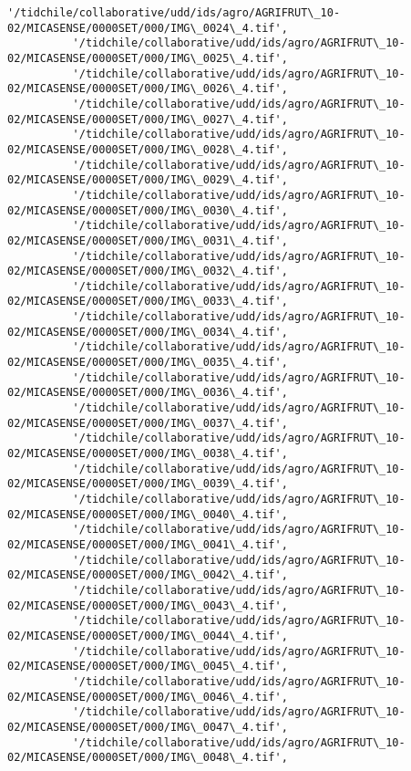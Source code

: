\documentclass[11pt]{article}
\begin{document}
\begin{Verbatim}[commandchars=\\\{\}]
          '/tidchile/collaborative/udd/ids/agro/AGRIFRUT\_10-02/MICASENSE/0000SET/000/IMG\_0024\_4.tif',
          '/tidchile/collaborative/udd/ids/agro/AGRIFRUT\_10-02/MICASENSE/0000SET/000/IMG\_0025\_4.tif',
          '/tidchile/collaborative/udd/ids/agro/AGRIFRUT\_10-02/MICASENSE/0000SET/000/IMG\_0026\_4.tif',
          '/tidchile/collaborative/udd/ids/agro/AGRIFRUT\_10-02/MICASENSE/0000SET/000/IMG\_0027\_4.tif',
          '/tidchile/collaborative/udd/ids/agro/AGRIFRUT\_10-02/MICASENSE/0000SET/000/IMG\_0028\_4.tif',
          '/tidchile/collaborative/udd/ids/agro/AGRIFRUT\_10-02/MICASENSE/0000SET/000/IMG\_0029\_4.tif',
          '/tidchile/collaborative/udd/ids/agro/AGRIFRUT\_10-02/MICASENSE/0000SET/000/IMG\_0030\_4.tif',
          '/tidchile/collaborative/udd/ids/agro/AGRIFRUT\_10-02/MICASENSE/0000SET/000/IMG\_0031\_4.tif',
          '/tidchile/collaborative/udd/ids/agro/AGRIFRUT\_10-02/MICASENSE/0000SET/000/IMG\_0032\_4.tif',
          '/tidchile/collaborative/udd/ids/agro/AGRIFRUT\_10-02/MICASENSE/0000SET/000/IMG\_0033\_4.tif',
          '/tidchile/collaborative/udd/ids/agro/AGRIFRUT\_10-02/MICASENSE/0000SET/000/IMG\_0034\_4.tif',
          '/tidchile/collaborative/udd/ids/agro/AGRIFRUT\_10-02/MICASENSE/0000SET/000/IMG\_0035\_4.tif',
          '/tidchile/collaborative/udd/ids/agro/AGRIFRUT\_10-02/MICASENSE/0000SET/000/IMG\_0036\_4.tif',
          '/tidchile/collaborative/udd/ids/agro/AGRIFRUT\_10-02/MICASENSE/0000SET/000/IMG\_0037\_4.tif',
          '/tidchile/collaborative/udd/ids/agro/AGRIFRUT\_10-02/MICASENSE/0000SET/000/IMG\_0038\_4.tif',
          '/tidchile/collaborative/udd/ids/agro/AGRIFRUT\_10-02/MICASENSE/0000SET/000/IMG\_0039\_4.tif',
          '/tidchile/collaborative/udd/ids/agro/AGRIFRUT\_10-02/MICASENSE/0000SET/000/IMG\_0040\_4.tif',
          '/tidchile/collaborative/udd/ids/agro/AGRIFRUT\_10-02/MICASENSE/0000SET/000/IMG\_0041\_4.tif',
          '/tidchile/collaborative/udd/ids/agro/AGRIFRUT\_10-02/MICASENSE/0000SET/000/IMG\_0042\_4.tif',
          '/tidchile/collaborative/udd/ids/agro/AGRIFRUT\_10-02/MICASENSE/0000SET/000/IMG\_0043\_4.tif',
          '/tidchile/collaborative/udd/ids/agro/AGRIFRUT\_10-02/MICASENSE/0000SET/000/IMG\_0044\_4.tif',
          '/tidchile/collaborative/udd/ids/agro/AGRIFRUT\_10-02/MICASENSE/0000SET/000/IMG\_0045\_4.tif',
          '/tidchile/collaborative/udd/ids/agro/AGRIFRUT\_10-02/MICASENSE/0000SET/000/IMG\_0046\_4.tif',
          '/tidchile/collaborative/udd/ids/agro/AGRIFRUT\_10-02/MICASENSE/0000SET/000/IMG\_0047\_4.tif',
          '/tidchile/collaborative/udd/ids/agro/AGRIFRUT\_10-02/MICASENSE/0000SET/000/IMG\_0048\_4.tif',

\end{Verbatim}
\end{document}
